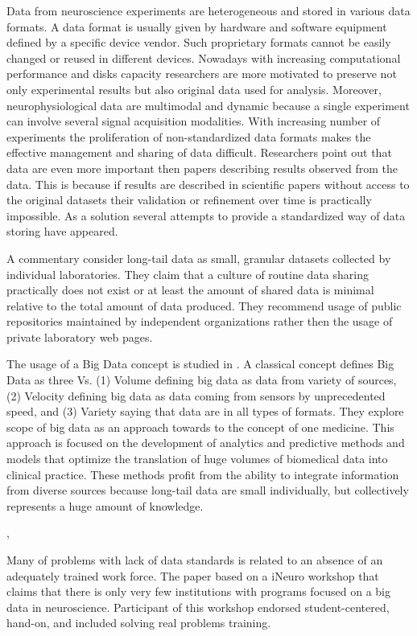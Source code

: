 \documentclass[utf8]{frontiersSCNS} %
\begin{document}
Data from neuroscience experiments are heterogeneous and stored in various data formats. A data format is usually given by hardware and software equipment defined by a specific device vendor. Such proprietary formats cannot be easily changed or reused in different devices. Nowadays with increasing computational performance and disks capacity researchers are more motivated to preserve not only experimental results but also original data used for analysis. Moreover, neurophysiological data are multimodal and dynamic because a single experiment can involve several signal acquisition modalities. With increasing number of experiments the proliferation of non-standardized data formats makes the effective management and sharing of data difficult. Researchers point out that data are even more important then papers describing results observed from the data. This is because if results are described in scientific papers without access to the original datasets their validation or refinement over time is practically impossible. As a solution several attempts to provide a standardized way of data storing have appeared.

A commentary \citep{Ferguson2014} consider long-tail data as small, granular datasets collected by individual laboratories. They claim that a culture of routine data sharing practically does not exist or at least the amount of shared data is minimal relative to the total amount of data produced. They recommend usage of public repositories maintained by independent organizations rather then the usage of private laboratory web pages. 

The usage of a Big Data concept is studied in \citep{10.3389/fvets.2017.00194}. A classical concept defines Big Data as three Vs\citep{mcafee2012big}. (1) Volume defining big data as data from variety of sources, (2) Velocity defining big data as data coming from sensors by unprecedented speed, and (3) Variety saying that data are in all types of formats. They explore scope of big data as an approach towards to the concept of one medicine. This approach is focused on the development of analytics and predictive methods and models that optimize the translation of huge volumes of biomedical data into clinical practice. These methods profit from the ability to integrate information from diverse sources because long-tail data are small individually, but collectively represents a huge amount of knowledge.

\citep{Insel2004}, 

Many of problems with lack of data standards is related to an absence of an adequately trained work force. The paper \citep{10.3389/fninf.2016.00028} based on a iNeuro workshop that claims that there is only very few institutions with programs focused on a big data in neuroscience. Participant of this workshop endorsed student-centered, hand-on, and included solving real problems training.
\end{document}
